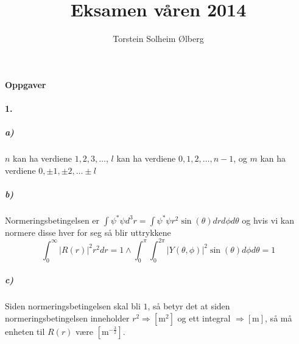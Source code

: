 \documentclass[11pt, A4paper,norsk]{article}
\author{Torstein Solheim Ølberg}
\title{Eksamen våren 2014}
\begin{document}
\maketitle
	\begin{center}
\Large \textbf{Oppgaver}
	\end{center}









		\paragraph{1.}
			\subparagraph{a)}
				\begin{flushleft}
$n$ kan ha verdiene $1, 2, 3, \dots$, $l$ kan ha verdiene $0, 1, 2, \dots, n - 1$, og $m$ kan ha verdiene $0, \pm 1, \pm 2, \dots \pm l$
				\end{flushleft}









			\subparagraph{b)}
				\begin{flushleft}
Normeringsbetingelsen er $\int \psi^{*} \psi d^3r = \int \psi^{*} \psi r^2 \sin(\theta) dr d\phi d\theta$ og hvis vi kan normere disse hver for seg så blir uttrykkene
$$\int_{0}^{\infty} |R(r)|^2 r^2 dr = 1 \wedge \int_{0}^{\pi} \int_{0}^{2\pi} |Y(\theta, \phi)|^2 \sin(\theta) d\phi d\theta = 1$$
				\end{flushleft}

			









			\subparagraph{c)}
				\begin{flushleft}
Siden normeringsbetingelsen skal bli $1$, så betyr det at siden normeringsbetingelsen inneholder $r^2 \Rightarrow [\text{m}^2]$ og ett integral $\Rightarrow [\text{m}]$, så må enheten til $R(r)$ være $[\text{m}^{-\frac{3}{2}}]$.
				\end{flushleft}
\end{document}
